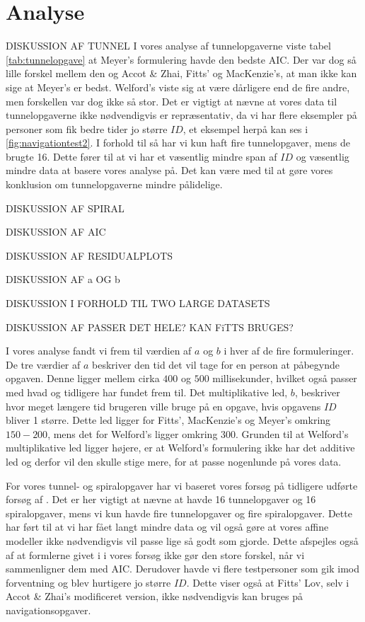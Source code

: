 \section*{Analyse}
DISKUSSION AF TUNNEL
I vores analyse af tunnelopgaverne viste tabel \ref{tab:tunnelopgave} at Meyer's formulering havde den bedste AIC. Der var dog så lille forskel mellem den og Accot \& Zhai, Fitts' og MacKenzie's, at man ikke kan sige at Meyer's er bedst. Welford's viste sig at være dårligere end de fire andre, men forskellen var dog ikke så stor. Det er vigtigt at nævne at vores data til tunnelopgaverne ikke nødvendigvis er repræsentativ, da vi har flere eksempler på personer som fik bedre tider jo større $ID$, et eksempel herpå kan ses i \ref{fig:navigationtest2}. I forhold til \cite{accot1997} så har vi kun haft fire tunnelopgaver, mens de brugte 16. Dette fører til at vi har et væsentlig mindre span af $ID$ og væsentlig mindre data at basere vores analyse på. Det kan være med til at gøre vores konklusion om tunnelopgaverne mindre pålidelige.

DISKUSSION AF SPIRAL


DISKUSSION AF AIC

DISKUSSION AF RESIDUALPLOTS

DISKUSSION AF a OG b

DISKUSSION I FORHOLD TIL TWO LARGE DATASETS

DISKUSSION AF PASSER DET HELE? KAN FiTTS BRUGES?


I vores analyse fandt vi frem til værdien af $a$ og $b$ i hver af de fire formuleringer. De tre værdier af $a$ beskriver den tid det vil tage for en person at påbegynde opgaven. Denne ligger mellem cirka $400$ og $500$ millisekunder, hvilket også passer med hvad \cite{crossman1957} og \cite{welford1968} tidligere har fundet frem til. Det multiplikative led, $b$, beskriver hvor meget længere tid brugeren ville bruge på en opgave, hvis opgavens $ID$ bliver 1 større. Dette led ligger for Fitts', MacKenzie's og Meyer's omkring $150-200$, mens det for Welford's ligger omkring $300$. Grunden til at Welford's multiplikative led ligger højere, er at Welford's formulering ikke har det additive led og derfor vil den skulle stige mere, for at passe nogenlunde på vores data.

For vores tunnel- og spiralopgaver har vi baseret vores forsøg på tidligere udførte forsøg af \cite{accot1997}. Det er her vigtigt at nævne at \cite{accot1997} havde 16 tunnelopgaver og 16 spiralopgaver, mens vi kun havde fire tunnelopgaver og fire spiralopgaver. Dette har ført til at vi har fået langt mindre data og vil også gøre at vores affine modeller ikke nødvendigvis vil passe lige så godt som \cite{accot1997} gjorde. Dette afspejles også af at formlerne givet i \cite{accot1997} i vores forsøg ikke gør den store forskel, når vi sammenligner dem med AIC. Derudover havde vi flere testpersoner som gik imod forventning og blev hurtigere jo større $ID$. Dette viser også at Fitts' Lov, selv i Accot \& Zhai's modificeret version, ikke nødvendigvis kan bruges på navigationsopgaver.

